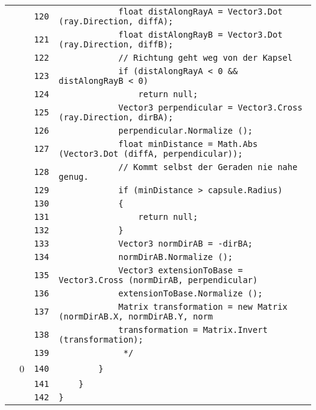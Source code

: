 \documentclass[a4paper,10pt]{article}
\begin{document}
\begin{longtable}[l]{lrrl}
\cellcolor{gray} &  & \verb~120~ & \verb~            float distAlongRayA = Vector3.Dot (ray.Direction, diffA);~\\
\cellcolor{gray} &  & \verb~121~ & \verb~            float distAlongRayB = Vector3.Dot (ray.Direction, diffB);~\\
\cellcolor{gray} &  & \verb~122~ & \verb~            // Richtung geht weg von der Kapsel~\\
\cellcolor{gray} &  & \verb~123~ & \verb~            if (distAlongRayA < 0 && distAlongRayB < 0)~\\
\cellcolor{gray} &  & \verb~124~ & \verb~                return null;~\\
\cellcolor{gray} &  & \verb~125~ & \verb~            Vector3 perpendicular = Vector3.Cross (ray.Direction, dirBA);~\\
\cellcolor{gray} &  & \verb~126~ & \verb~            perpendicular.Normalize ();~\\
\cellcolor{gray} &  & \verb~127~ & \verb~            float minDistance = Math.Abs (Vector3.Dot (diffA, perpendicular));~\\
\cellcolor{gray} &  & \verb~128~ & \verb~            // Kommt selbst der Geraden nie nahe genug.~\\
\cellcolor{gray} &  & \verb~129~ & \verb~            if (minDistance > capsule.Radius)~\\
\cellcolor{gray} &  & \verb~130~ & \verb~            {~\\
\cellcolor{gray} &  & \verb~131~ & \verb~                return null;~\\
\cellcolor{gray} &  & \verb~132~ & \verb~            }~\\
\cellcolor{gray} &  & \verb~133~ & \verb~            Vector3 normDirAB = -dirBA;~\\
\cellcolor{gray} &  & \verb~134~ & \verb~            normDirAB.Normalize ();~\\
\cellcolor{gray} &  & \verb~135~ & \verb~            Vector3 extensionToBase = Vector3.Cross (normDirAB, perpendicular)~\\
\cellcolor{gray} &  & \verb~136~ & \verb~            extensionToBase.Normalize ();~\\
\cellcolor{gray} &  & \verb~137~ & \verb~            Matrix transformation = new Matrix (normDirAB.X, normDirAB.Y, norm~\\
\cellcolor{gray} &  & \verb~138~ & \verb~            transformation = Matrix.Invert (transformation);~\\
\cellcolor{gray} &  & \verb~139~ & \verb~             */~\\
\cellcolor{red} & 0 & \verb~140~ & \verb~        }~\\
\cellcolor{gray} &  & \verb~141~ & \verb~    }~\\
\cellcolor{gray} &  & \verb~142~ & \verb~}~\\
\end{longtable}
\newpage
\end{document}
